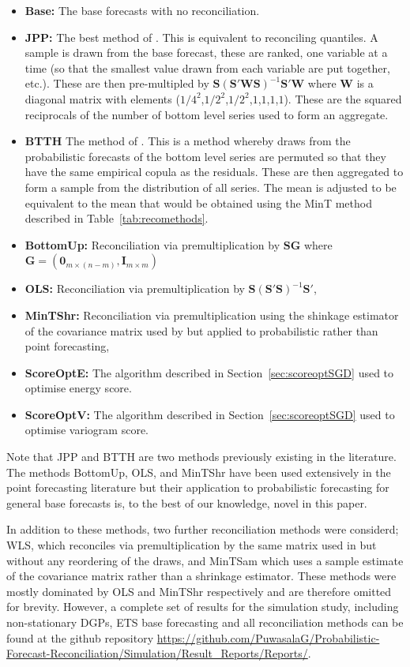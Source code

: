 \documentclass[12pt]{article}
\theoremstyle{definition}
\begin{document}
\begin{itemize}
	\item \textbf{Base:} The base forecasts with no reconciliation.
	\item \textbf{JPP:} The best method of \cite{JeoEtAl2019}.  This is equivalent to reconciling quantiles.  A sample is drawn from the base forecast, these are ranked, one variable at a time (so that the smallest value drawn from each variable are put together, etc.).  These are then pre-multipled by $\bm{S}\left(\bm{S}'\bm{W}\bm{S}\right)^{-1}\bm{S}'\bm{W}$ where $\bm{W}$ is a diagonal matrix with elements ($1/4^2$,$1/2^2$,$1/2^2$,$1$,$1$,$1$,$1$).  These are the squared reciprocals of the number of bottom level series used to form an aggregate.
	\item \textbf{BTTH} The method of \cite{Taieb2017}.  This is a method whereby draws from the probabilistic forecasts of the bottom level series are permuted so that they have the same empirical copula as the residuals.  These are then aggregated to form a sample from the distribution of all series.  The mean is adjusted to be equivalent to the mean that would be obtained using the MinT method \cite{WicEtAl2019} described in Table~\ref{tab:recomethods}. 
	\item \textbf{BottomUp:} Reconciliation via premultiplication by $\bm{S}\bm{G}$ where $\bm{G}=\left(\bm{0}_{m\times(n-m)},\bm{I}_{m\times m}\right)$ 
	\item \textbf{OLS:} Reconciliation via premultiplication by $\bm{S}\left(\bm{S}'\bm{S}\right)^{-1}\bm{S}'$,
	\item \textbf{MinTShr:} Reconciliation via premultiplication using the shinkage estimator of the covariance matrix used by \cite{WicEtAl2019} but applied to probabilistic rather than point forecasting,
	\item \textbf{ScoreOptE:} The algorithm described in Section~\ref{sec:scoreoptSGD} used to optimise energy score.
	\item \textbf{ScoreOptV:} The algorithm described in Section~\ref{sec:scoreoptSGD} used to optimise variogram score.
\end{itemize}

Note that JPP and BTTH are two methods previously existing in the literature. The methods BottomUp, OLS, and MinTShr have been used extensively in the point forecasting literature but their application to probabilistic forecasting for general base forecasts is, to the best of our knowledge, novel in this paper.

In addition to these methods, two further reconciliation methods were considerd; WLS, which reconciles via premultiplication by the same matrix used in \cite{JeoEtAl2019} but without any reordering of the draws, and MinTSam which uses a sample estimate of the covariance matrix rather than a shrinkage estimator.  These methods were mostly dominated by OLS and MinTShr respectively and are therefore omitted for brevity.  However, a complete set of results for the simulation study, including non-stationary DGPs, ETS base forecasting and all reconciliation methods can be found at the github repository \url{https://github.com/PuwasalaG/Probabilistic-Forecast-Reconciliation/Simulation/Result_Reports/Reports/}.
\end{document}
